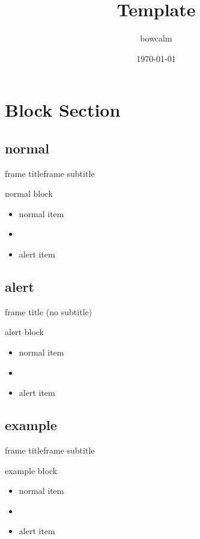 \documentclass[12pt,unicode]{beamer}
\title{Template}
\author{\textcolor{normal text.bg}{bowcalm}}
\date{\today}
\begin{document}
  \begin{frame}
    \maketitle
  \end{frame}

  \section{Block Section}
  \subsection{normal}
  \begin{frame}{frame title}{frame subtitle}
    \begin{block}{normal block}
      \begin{itemize}
        \item normal item
        \item {}
        \item \alert{alert item}
      \end{itemize}
    \end{block}
  \end{frame}

  \subsection{alert}
  \begin{frame}{frame title (no subtitle)}
    \begin{alertblock}{alert block}
      \begin{itemize}
        \item normal item
        \item {}
        \item \alert{alert item}
      \end{itemize}
    \end{alertblock}
  \end{frame}

  \subsection{example}
  \begin{frame}{frame title}{frame subtitle}
    \begin{exampleblock}{example block}
      \begin{itemize}
        \item normal item
        \item {}
        \item \alert{alert item}
      \end{itemize}
    \end{exampleblock}
  \end{frame}
\end{document}
